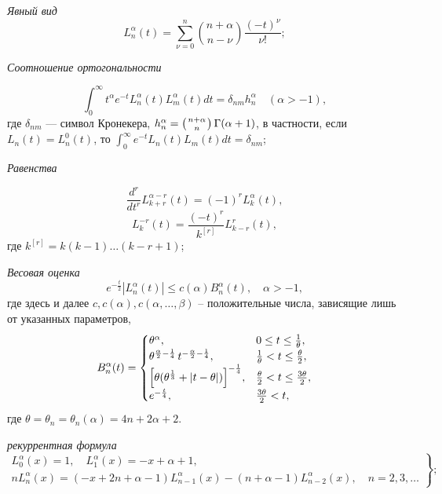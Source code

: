 \textit{Явный вид}
\begin{equation}\label{lag-2.2}
L_n^\alpha(t) =
\sum\limits_{\nu=0}^{n}
\binom{n+\alpha}{n-\nu}
\frac{(-t)^\nu}{\nu!};
\end{equation}

\textit{Соотношение ортогональности}

\begin{equation}
\label{lag-2.3}
\int_0^{\infty} t^{\alpha} e^{-t} L^{\alpha}_{n}(t) L^{\alpha}_{m}(t) dt = \delta_{nm} h^{\alpha}_n \quad (\alpha > -1),
\end{equation}
где $\delta_{nm}$ --- символ Кронекера,
$h^{\alpha}_n = \left( n+\alpha \atop n \right) \Gamma(\alpha +1)$,
в частности, если $L_{n}(t) = L^{0}_{n}(t)$, то $\int_0^{\infty} e^{-t} L_{n}(t) L_{m}(t) dt = \delta_{nm}$;

\textit{ Равенства}

\begin{equation} \label{lag-2.6}
\frac{d^r}{dt^r} L_{k+r}^{\alpha-r}(t) = (-1)^{r} L_{k}^{\alpha}(t),
\end{equation}
\begin{equation}\label{lag-2.7}
L_{k}^{-r}(t) = \frac{(-t)^{r}}{k^{[r]}} L_{k-r}^{r}(t),
\end{equation}
где $k^{[r]} = k(k-1)\ldots(k-r+1)$;


\textit{Весовая оценка} \cite{AskeyWaiger}
\begin{equation}\label{lag-2.10}
e^{-\frac{t}{2}}|L_n^\alpha(t)| \le c(\alpha) B_n^\alpha(t), \quad \alpha>-1,
\end{equation}
где здесь и далее $c,c(\alpha),c(\alpha,\ldots,\beta)$ -- положительные числа, зависящие лишь от указанных параметров,
\begin{equation}\label{lag-2.11}
B_n^\alpha(t)=
\begin{cases}
\theta^\alpha, &0 \le t \le \frac{1}{\theta},\\
\theta^{\frac{\alpha}{2} - \frac{1}{4}}\,t^{-\frac{\alpha}{2} - \frac{1}{4}}, & \frac{1}{\theta} < t \le \frac{\theta}{2},\\
\Bigl[
\theta(\theta^{\frac{1}{3}}+|t-\theta|)
\Bigr]^{-\frac{1}{4}}, & \frac{\theta}{2} < t \le \frac{3\theta}{2},\\
e^{-\frac{t}{4}}, &\frac{3\theta}{2}< t,
\end{cases}
\end{equation}
где $\theta=\theta_n=\theta_n(\alpha)=4n+2\alpha+2$.

\textit{рекуррентная формула}
\begin{equation}\label{Ram_eq4}
\left.\begin{gathered}
L_{0}^{\alpha}(x)=1, \quad L_1^{\alpha}(x)=-x+\alpha+1,\\
nL_n^{\alpha}(x)=(-x+2n+\alpha-1)L_{n-1}^{\alpha}(x)-(n+\alpha-1)L_{n-2}^{\alpha}(x), \quad n=2, 3, \ldots
\end{gathered}\right\};
\end{equation}


